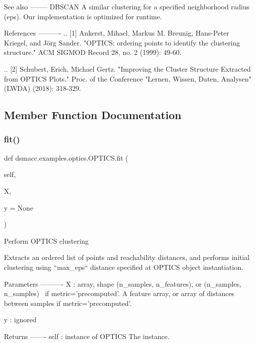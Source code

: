 \begin{DoxyVerb}
See also
--------
DBSCAN
    A similar clustering for a specified neighborhood radius (eps).
    Our implementation is optimized for runtime.

References
----------
.. [1] Ankerst, Mihael, Markus M. Breunig, Hans-Peter Kriegel,
   and Jörg Sander. "OPTICS: ordering points to identify the clustering
   structure." ACM SIGMOD Record 28, no. 2 (1999): 49-60.

.. [2] Schubert, Erich, Michael Gertz.
   "Improving the Cluster Structure Extracted from OPTICS Plots." Proc. of
   the Conference "Lernen, Wissen, Daten, Analysen" (LWDA) (2018): 318-329.
\end{DoxyVerb}
 

\subsection{Member Function Documentation}
\mbox{\label{classdsmacc_1_1examples_1_1optics_1_1OPTICS_ade14f35d1a29e595c853098bc4e49b29}} 
\subsubsection{\texorpdfstring{fit()}{fit()}}
{\footnotesize\ttfamily def dsmacc.\+examples.\+optics.\+O\+P\+T\+I\+C\+S.\+fit (\begin{DoxyParamCaption}\item[{}]{self,  }\item[{}]{X,  }\item[{}]{y = {\ttfamily None} }\end{DoxyParamCaption})}

\begin{DoxyVerb}Perform OPTICS clustering

Extracts an ordered list of points and reachability distances, and
performs initial clustering using ``max_eps`` distance specified at
OPTICS object instantiation.

Parameters
----------
X : array, shape (n_samples, n_features), or (n_samples, n_samples)  \
if metric=’precomputed’.
    A feature array, or array of distances between samples if
    metric='precomputed'.

y : ignored

Returns
-------
self : instance of OPTICS
    The instance.
\end{DoxyVerb}
 
